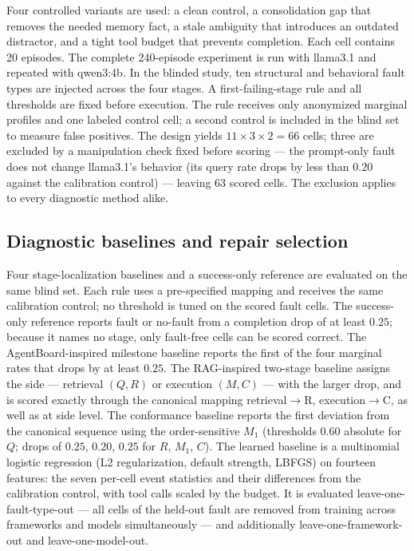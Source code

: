 \documentclass[letterpaper]{article} %
\begin{document}
Four controlled variants are used: a clean control, a consolidation gap that removes the needed memory fact, a stale ambiguity that introduces an outdated distractor, and a tight tool budget that prevents completion. Each cell contains 20 episodes. The complete 240-episode experiment is run with llama3.1 and repeated with qwen3:4b. In the blinded study, ten structural and behavioral fault types are injected across the four stages. A first-failing-stage rule and all thresholds are fixed before execution. The rule receives only anonymized marginal profiles and one labeled control cell; a second control is included in the blind set to measure false positives. The design yields $11\times3\times2=66$ cells; three are excluded by a manipulation check fixed before scoring --- the prompt-only fault does not change llama3.1's behavior (its query rate drops by less than $0.20$ against the calibration control) --- leaving 63 scored cells. The exclusion applies to every diagnostic method alike.

\subsection{Diagnostic baselines and repair selection}
\label{sec:baselines-method}

Four stage-localization baselines and a success-only reference are
evaluated on the same blind set. Each rule uses a pre-specified
mapping and receives the same calibration control; no threshold is
tuned on the scored fault cells. The success-only reference reports
fault or no-fault from a completion drop of at least $0.25$; because
it names no stage, only fault-free cells can be scored correct. The
AgentBoard-inspired milestone baseline reports the first of the four
marginal rates that drops by at least $0.25$. The RAG-inspired
two-stage baseline assigns the side --- retrieval $(Q,R)$ or
execution $(M,C)$ --- with the larger drop, and is scored exactly
through the canonical mapping retrieval${}\to{}$R,
execution${}\to{}$C, as well as at side level. The conformance
baseline reports the first deviation from the canonical sequence
using the order-sensitive $M_1$ (thresholds $0.60$ absolute for $Q$;
drops of $0.25$, $0.20$, $0.25$ for $R$, $M_1$, $C$). The learned
baseline is a multinomial logistic regression (L2 regularization,
default strength, LBFGS) on fourteen features: the seven per-cell
event statistics and their differences from the calibration control,
with tool calls scaled by the budget. It is evaluated
leave-one-fault-type-out --- all cells of the held-out fault are
removed from training across frameworks and models simultaneously
--- and additionally leave-one-framework-out and
leave-one-model-out.
\end{document}
